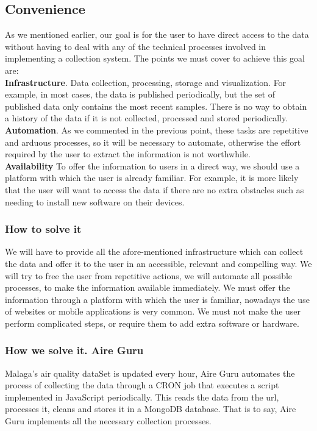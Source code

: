 \subsection{Convenience}
As we mentioned earlier, our goal is for the user to have direct access to the data without having to deal with any
of the technical processes involved in implementing a collection system. The points we must cover to achieve this goal are: \\

\textbf{Infrastructure}. Data collection, processing, storage and visualization. For example, in most cases, the data is
published periodically, but the set of published data only contains the most recent samples. There is no way to obtain
a history of the data if it is not collected, processed and stored periodically. \\

\textbf{Automation}. As we commented in the previous point, these tasks are repetitive and arduous processes, so it will be
necessary to automate, otherwise the effort required by the user to extract the information is not worthwhile. \\

\textbf{Availability} To offer the information to users in a direct way, we should use a platform with which the user is already 
familiar. For example, it is more likely that the user will want to access the data if there are no extra obstacles such as needing 
to install new software on their devices. \\

\subsubsection{How to solve it} 
We will have to provide all the afore-mentioned infrastructure which can collect the data and offer it to the user in an accessible, relevant and compelling way.
We will try to free the user from repetitive actions, we will automate all possible processes, to make the information available immediately.
We must offer the information through a platform with which the user is familiar, nowadays the use of websites or mobile applications is very common.
We must not make the user perform complicated steps, or require them to add extra software or hardware.

\subsubsection{How we solve it. Aire Guru} 
Malaga's air quality dataSet is updated every hour, Aire Guru automates the process of collecting the
data through a CRON job that executes a script implemented in JavaScript periodically. This reads the data from the url, processes it,
cleans and stores it in a MongoDB database. That is to say, Aire Guru implements all the necessary collection processes.

